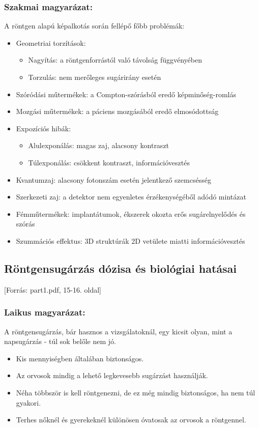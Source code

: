 \documentclass[a4paper,12pt]{article}
\begin{document}
\subsubsection{Szakmai magyarázat:} A röntgen alapú képalkotás során fellépő főbb problémák:

\begin{itemize} \item Geometriai torzítások: \begin{itemize} \item Nagyítás: a röntgenforrástól való távolság függvényében \item Torzulás: nem merőleges sugárirány esetén \end{itemize} \item Szóródási műtermékek: a Compton-szórásból eredő képminőség-romlás \item Mozgási műtermékek: a páciens mozgásából eredő elmosódottság \item Expozíciós hibák: \begin{itemize} \item Alulexponálás: magas zaj, alacsony kontraszt \item Túlexponálás: csökkent kontraszt, információvesztés \end{itemize} \item Kvantumzaj: alacsony fotonszám esetén jelentkező szemcsésség \item Szerkezeti zaj: a detektor nem egyenletes érzékenységéből adódó mintázat \item Fémműtermékek: implantátumok, ékszerek okozta erős sugárelnyelődés és szórás \item Szummációs effektus: 3D struktúrák 2D vetülete miatti információvesztés \end{itemize}

\subsection{Röntgensugárzás dózisa és biológiai hatásai} [Forrás: part1.pdf, 15-16. oldal]

\subsubsection{Laikus magyarázat:} A röntgensugárzás, bár hasznos a vizsgálatoknál, egy kicsit olyan, mint a napsugárzás - túl sok belőle nem jó.

\begin{itemize} \item Kis mennyiségben általában biztonságos. \item Az orvosok mindig a lehető legkevesebb sugárzást használják. \item Néha többször is kell röntgenezni, de ez még mindig biztonságos, ha nem túl gyakori. \item Terhes nőknél és gyerekeknél különösen óvatosak az orvosok a röntgennel. \end{itemize}
\end{document}
